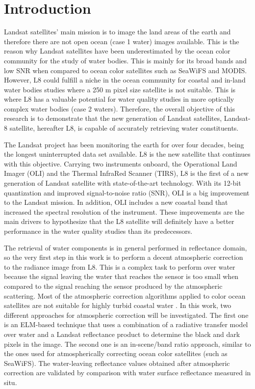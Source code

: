 \chapter{Introduction}
\label{ch:introduction} 
Landsat satellites' main mission is to image the land areas of the earth and therefore there are not open ocean (case 1 water) images available. This is the reason why Landsat satellites have been underestimated by the ocean color community for the study of water bodies. This is mainly for its broad bands and low SNR when compared to ocean color satellites such as SeaWiFS and MODIS. However, L8 could fulfill a niche in the ocean community for coastal and in-land water  bodies studies where a 250 m pixel size satellite is not suitable. This is where L8 has a valuable potential for water quality studies in more optically complex water bodies (case 2 waters). Therefore, the overall objective of this research is to demonstrate that the new generation of Landsat satellites, Landsat-8 satellite, hereafter L8, is capable of accurately retrieving water constituents. 

The Landsat project has been monitoring the earth for over four decades, being the longest uninterrupted data set available. L8 is the new satellite that continues with this objective. Carrying two instruments onboard, the Operational Land Imager (OLI) and the Thermal InfraRed Scanner (TIRS), L8 is the first of a new generation of Landsat satellite with state-of-the-art technology. With its 12-bit quantization and improved signal-to-noise ratio (SNR), OLI is a big improvement to the Landsat mission. In addition, OLI includes a new coastal band that increased the spectral resolution of the instrument. These improvements are the main drivers to hypothesize that the L8 satellite will definitely have a better performance in the water quality studies than its predecessors. 

The retrieval of water components is {\color{red} in general performed in reflectance domain}, so the very first step in this work is to perform a {\color{red} decent} atmospheric correction to the radiance image from L8. This is a complex task to perform over water because the signal leaving the water that reaches the sensor is too small when compared to the signal reaching the sensor produced by the atmospheric scattering. Most of the atmospheric correction algorithms applied to color ocean satellites are not suitable for highly turbid coastal water \cite{Patt2003}. In this work, two different approaches for atmospheric correction will be investigated. The first one is an ELM-based technique that uses a combination of a radiative transfer model over water and a Landsat reflectance product to determine the black and dark pixels in the image. The second one is an in-scene/band ratio approach, similar to the ones used for atmospherically correcting ocean color satellites (such as SeaWiFS). The water-leaving reflectance values obtained after atmospheric correction are validated by comparison with water surface reflectance measured in situ. 

